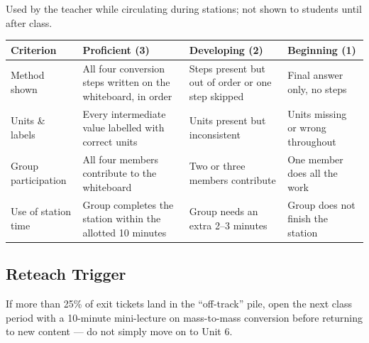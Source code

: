 Used by the teacher while circulating during stations; not shown to
students until after class.

\begin{table}[H]
\centering
\small
\begin{tabularx}{\textwidth}{@{}l X X X@{}}
\toprule
\textbf{Criterion} & \textbf{Proficient (3)} & \textbf{Developing (2)} & \textbf{Beginning (1)} \\
\midrule
Method shown & All four conversion steps written on the whiteboard, in order & Steps present but out of order or one step skipped & Final answer only, no steps \\
Units \& labels & Every intermediate value labelled with correct units & Units present but inconsistent & Units missing or wrong throughout \\
Group participation & All four members contribute to the whiteboard & Two or three members contribute & One member does all the work \\
Use of station time & Group completes the station within the allotted 10 minutes & Group needs an extra 2--3 minutes & Group does not finish the station \\
\bottomrule
\end{tabularx}
\end{table}

\subsection*{Reteach Trigger}

If more than 25\% of exit tickets land in the ``off-track'' pile, open
the next class period with a 10-minute mini-lecture on mass-to-mass
conversion before returning to new content --- do not simply move on to
Unit 6.
